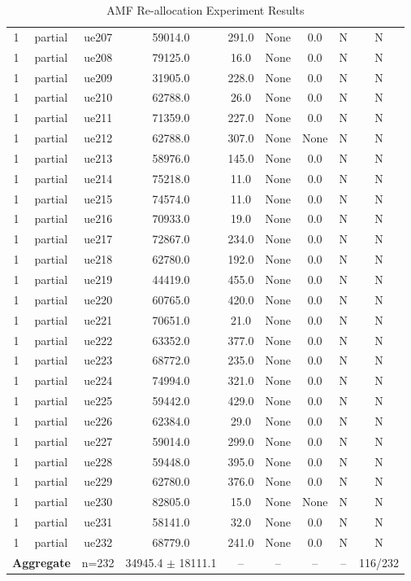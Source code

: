 \begin{table}[ht]
\begin{tabular}{|c|c|c|c|c|c|c|c|c|}
1 & partial & ue207 & 59014.0 & 291.0 & None & 0.0 & N & N \\
1 & partial & ue208 & 79125.0 & 16.0 & None & 0.0 & N & N \\
1 & partial & ue209 & 31905.0 & 228.0 & None & 0.0 & N & N \\
1 & partial & ue210 & 62788.0 & 26.0 & None & 0.0 & N & N \\
1 & partial & ue211 & 71359.0 & 227.0 & None & 0.0 & N & N \\
1 & partial & ue212 & 62788.0 & 307.0 & None & None & N & N \\
1 & partial & ue213 & 58976.0 & 145.0 & None & 0.0 & N & N \\
1 & partial & ue214 & 75218.0 & 11.0 & None & 0.0 & N & N \\
1 & partial & ue215 & 74574.0 & 11.0 & None & 0.0 & N & N \\
1 & partial & ue216 & 70933.0 & 19.0 & None & 0.0 & N & N \\
1 & partial & ue217 & 72867.0 & 234.0 & None & 0.0 & N & N \\
1 & partial & ue218 & 62780.0 & 192.0 & None & 0.0 & N & N \\
1 & partial & ue219 & 44419.0 & 455.0 & None & 0.0 & N & N \\
1 & partial & ue220 & 60765.0 & 420.0 & None & 0.0 & N & N \\
1 & partial & ue221 & 70651.0 & 21.0 & None & 0.0 & N & N \\
1 & partial & ue222 & 63352.0 & 377.0 & None & 0.0 & N & N \\
1 & partial & ue223 & 68772.0 & 235.0 & None & 0.0 & N & N \\
1 & partial & ue224 & 74994.0 & 321.0 & None & 0.0 & N & N \\
1 & partial & ue225 & 59442.0 & 429.0 & None & 0.0 & N & N \\
1 & partial & ue226 & 62384.0 & 29.0 & None & 0.0 & N & N \\
1 & partial & ue227 & 59014.0 & 299.0 & None & 0.0 & N & N \\
1 & partial & ue228 & 59448.0 & 395.0 & None & 0.0 & N & N \\
1 & partial & ue229 & 62780.0 & 376.0 & None & 0.0 & N & N \\
1 & partial & ue230 & 82805.0 & 15.0 & None & None & N & N \\
1 & partial & ue231 & 58141.0 & 32.0 & None & 0.0 & N & N \\
1 & partial & ue232 & 68779.0 & 241.0 & None & 0.0 & N & N \\
\multicolumn{2}{|c|}{\textbf{Aggregate}} & n=232 & 34945.4 $\pm$ 18111.1 & -- & -- & -- & -- & 116/232 \\
\hline
\end{tabular}
\caption{AMF Re-allocation Experiment Results}
\label{tab:amf_realloc}
\end{table}
